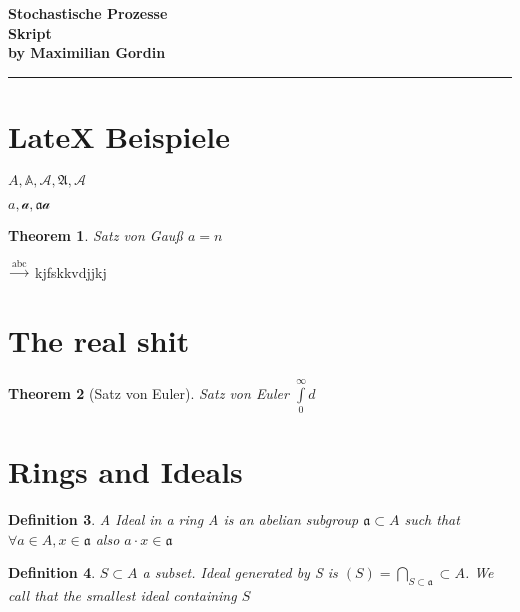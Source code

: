 \documentclass[a4paper,oneside,11pt]{article}
\newtheorem{thm}{Theorem}[section]
\newtheorem{defin}[thm]{Definition}
\newcommand{\bA}{\mathbb{A}}
\newcommand{\cA}{\mathcal{A}}
\newcommand{\fA}{\mathfrak{A}}
\newcommand{\sA}{\mathscr{A}}
\begin{document}
 
\begin{center}
{\Large\bf Stochastische Prozesse} \\
\medskip
\textbf{\large Skript} \\
\bigskip
\textbf{by Maximilian Gordin}
\end{center}

\bigskip
\hrule
\bigskip\bigskip 

\section*{LateX Beispiele}

$A, \bA,\cA,\fA, \sA $

$ a, \mathcal{a}, \mathfrak{a} \mathscr{a}$

\begin{thm}
  Satz von Gauß $ a=n $
\end{thm}
$ \overset{\text{abc}}{\rightarrow } $
kjfskkvdjjkj

\section*{The real shit}
\begin{thm}[Satz von Euler]
  Satz von Euler $ \int\limits_{0}^{\infty}d $
\end{thm}


\section{Rings and Ideals}

\begin{defin}
  A Ideal in a ring A is an abelian subgroup 
  $ \mathfrak{a}\subset A $ such that $ \forall a\in A, x \in \mathfrak{a} $ 
  also $ a\cdot x\in \mathfrak{a} $
\end{defin}
\begin{defin}
  $ S\subset A $ a subset. Ideal generated by S is $ (S)=\bigcap\limits_{S\subset \mathfrak{a}}\subset A $.
   We call that the smallest ideal containing $ S $
\end{defin}
\end{document}
